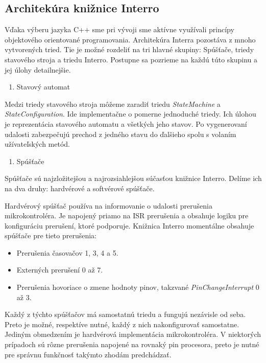 \subsection{Architekúra knižnice Interro} \label{subsection:architecture-interro}
Vďaka výberu jazyka C++ sme pri vývoji sme aktívne využívali princípy objektového orientované programovania. Architekúra Interra pozostáva z mnoho vytvorených tried.
Tie je možné rozdeliť na tri hlavné skupiny: Spúšťače, triedy stavového stroja a triedu Interro.
Postupne sa pozrieme na každú túto skupinu a jej úlohy detailnejšie. \par
\begin{enumerate}
    \item Stavový automat
\end{enumerate}
Medzi triedy stavového stroja môžeme zaradiť triedu \textit{StateMachine} a \textit{StateConfiguration}. Ide implementačne o pomerne jednoduché triedy. Ich úlohou
je reprezentácia stavového automatu a všetkých jeho stavov. Po vygenerovaní udalosti zabezpečujú prechod z jedného stavu do ďalšieho spolu s volaním užívateľských
metód. \par

\begin{enumerate}[resume]
    \item Spúšťače
\end{enumerate}
Spúšťače sú najzložitejšou a najrozsiahlejšou súčasťou knižnice Interro.
Delíme ich na dva druhy: hardvérové a softvérové spúšťače. \par
Hardvérový spúšťač používa na informovanie o udalosti prerušenia mikrokontroléra. Je napojený priamo na ISR prerušenia a obsahuje logiku pre konfiguráciu prerušení,
ktoré podporuje. Knižnica Interro momentálne obsahuje spúšťače pre tieto prerušenia:
\begin{itemize}
    \item Prerušenia časovačov 1, 3, 4 a 5.
    \item Externých prerušení 0 až 7.
    \item Prerušenia hovoriace o zmene hodnoty pinov, takzvané \textit{PinChangeInterrupt} 0 až 3.
\end{itemize}

Každý z týchto spúšťačov má samostatnú triedu a fungujú nezávisle od seba. Preto je možné, respektíve nutné, každý z nich
nakonfigurovať samostatne. Jediným obmedzením je hardvérová implementácia mikrokontroléra. V niektorých prípadoch sú rôzne prerušenia napojené na rovnaký pin procesora,
preto je nutné pre správnu funkčnosť takýmto zhodám predchádzať. \par

